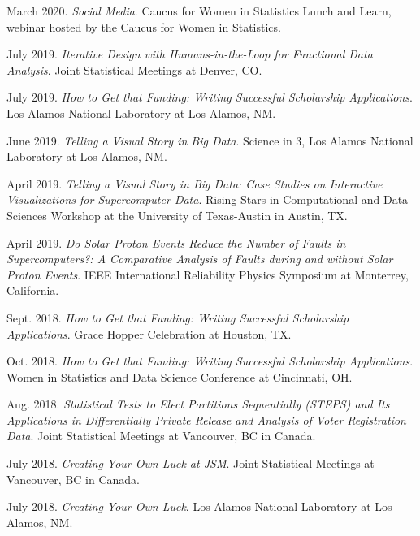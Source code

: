 \documentclass[11pt, letterpaper, roman]{moderncv} %
\begin{document}
\begin{etaremune}[topsep=0pt, itemsep=5pt, partopsep=0pt, parsep=0pt]
    \item March 2020. \textit{Social Media}. Caucus for Women in Statistics Lunch and Learn, webinar hosted by the Caucus for Women in Statistics.
    
    \item July 2019. \textit{Iterative Design with Humans-in-the-Loop for Functional Data Analysis}. Joint Statistical Meetings at Denver, CO. 
    
    \item July 2019. \textit{How to Get that Funding: Writing Successful Scholarship Applications}. Los Alamos National Laboratory at Los Alamos, NM.
    
    \item June 2019. \textit{Telling a Visual Story in Big Data}. Science in 3, Los Alamos National Laboratory at Los Alamos, NM. 
    
    \item April 2019. \textit{Telling a Visual Story in Big Data: Case Studies on Interactive Visualizations for Supercomputer Data}. Rising Stars in Computational and Data Sciences Workshop at the University of Texas-Austin in Austin, TX.
    
    \item April 2019. \textit{Do Solar Proton Events Reduce the Number of Faults in Supercomputers?: A Comparative Analysis of Faults during and without Solar Proton Events}. IEEE International Reliability Physics Symposium at Monterrey, California.
    
    \item Sept. 2018. \textit{How to Get that Funding: Writing Successful Scholarship Applications}. Grace Hopper Celebration at Houston, TX.
    
    \item Oct. 2018. \textit{How to Get that Funding: Writing Successful Scholarship Applications}. Women in Statistics and Data Science Conference at Cincinnati, OH.
    
    \item Aug. 2018. \textit{Statistical Tests to Elect Partitions Sequentially (STEPS) and Its Applications in Differentially Private Release and Analysis of Voter Registration Data}. Joint Statistical Meetings at Vancouver, BC in Canada.
    
    \item July 2018. \textit{Creating Your Own Luck at JSM}. Joint Statistical Meetings at Vancouver, BC in Canada.
    
    \item July 2018. \textit{Creating Your Own Luck}. Los Alamos National Laboratory at Los Alamos, NM.
    

\end{etaremune}
\end{document}
